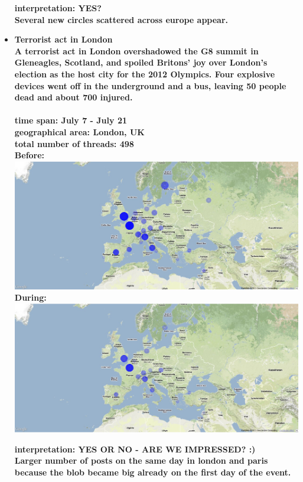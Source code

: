 \documentclass[11pt,a4paper,english]{article}
\begin{document}
\begin{itemize}
					\bf interpretation: \rm YES?
					\\ Several new circles scattered across europe appear.
						


				\item \bf Terrorist act in London \rm
					\\ A terrorist act in London overshadowed the G8 summit in Gleneagles, Scotland, and spoiled Britons' joy over London's election as the host city for the 2012 Olympics. Four explosive devices went off in the underground and a bus, leaving 50 people dead and about 700 injured.
					\\\\ \bf time span: \rm July 7 - July 21
					\\ \bf geographical area: \rm London, UK
					\\ \bf total number of threads: \rm 498
					\\ \bf Before: \rm
					\includegraphics[width=130mm]{img/pre-london}
					\\ \bf During: \rm
					\includegraphics[width=130mm]{img/post-london}
					
					\bf interpretation: \rm YES OR NO - ARE WE IMPRESSED? :)
					\\ Larger number of posts on the same day in london and paris because the blob became big already on the first day of the event.



\end{itemize}
\end{document}
